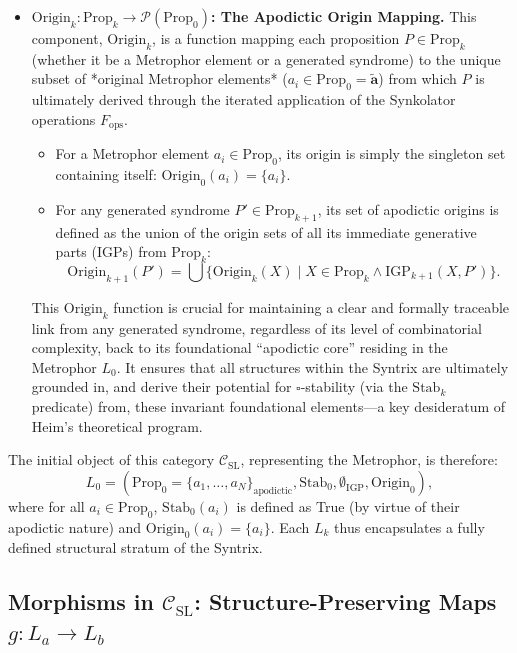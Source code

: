 \documentclass[
    12pt,              %
    a4paper,           %
    headings=normal,   %
    twoside=true,      %
    BCOR=8mm,          %
]{scrbook}
\newcommand{\q}[1]{\enquote{#1}}
\newcommand{\metrophor}{\bm{\widetilde{a}}}
\newcommand{\BoxSyn}{\square}
\newcommand{\fops}{F_{\text{ops}}}
\begin{document}
\begin{itemize}
    \item   \textbf{\(\text{Origin}_k: \text{Prop}_k \to \mathcal{P}(\text{Prop}_0)\): The Apodictic Origin Mapping.}
        This component, \(\text{Origin}_k\), is a function mapping each proposition \(P \in \text{Prop}_k\) (whether it be a Metrophor element or a generated syndrome) to the unique subset of *original Metrophor elements* (\(a_i \in \text{Prop}_0 = \metrophor\)) from which \(P\) is ultimately derived through the iterated application of the Synkolator operations \(\fops\).
        \begin{itemize}
            \item   For a Metrophor element \(a_i \in \text{Prop}_0\), its origin is simply the singleton set containing itself: \(\text{Origin}_0(a_i) = \{a_i\}\).
            \item   For any generated syndrome \(P' \in \text{Prop}_{k+1}\), its set of apodictic origins is defined as the union of the origin sets of all its immediate generative parts (IGPs) from \(\text{Prop}_k\):
                \[ \text{Origin}_{k+1}(P') = \bigcup \{ \text{Origin}_k(X) \mid X \in \text{Prop}_k \land \text{IGP}_{k+1}(X, P') \}. \]
        \end{itemize}
        This \(\text{Origin}_k\) function is crucial for maintaining a clear and formally traceable link from any generated syndrome, regardless of its level of combinatorial complexity, back to its foundational \q{apodictic core} residing in the Metrophor \(L_0\). It ensures that all structures within the Syntrix are ultimately grounded in, and derive their potential for \(\BoxSyn\)-stability (via the \(\text{Stab}_k\) predicate) from, these invariant foundational elements—a key desideratum of Heim's theoretical program.
\end{itemize}
The initial object of this category \(\mathcal{C}_{\text{SL}}\), representing the Metrophor, is therefore:
\[ L_0 = (\text{Prop}_0 = \{a_1, \ldots, a_N\}_{\text{apodictic}}, \text{Stab}_0, \emptyset_{\text{IGP}}, \text{Origin}_0), \]
where for all \(a_i \in \text{Prop}_0\), \(\text{Stab}_0(a_i)\) is defined as True (by virtue of their apodictic nature) and \(\text{Origin}_0(a_i) = \{a_i\}\). Each \(L_k\) thus encapsulates a fully defined structural stratum of the Syntrix.

\subsection{Morphisms in \(\mathcal{C}_{\text{SL}}\): Structure-Preserving Maps \(g: L_a \to L_b\)}
\label{sec:ch2_morphisms_csl} 
\end{document}
